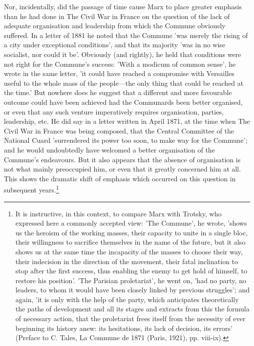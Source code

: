 Nor, incidentally, did the passage of time cause Marx to place greater emphasis than he had done in The Civil War in France on the question of the lack of adequate organisation and leadership from which the Commune obviously suffered. In a letter of 1881 he noted that the Commune 'was merely the rising of a city under exceptional conditions', and that its majority 'was in no wise socialist, nor could it be'. Obviously (and rightly), he held that conditions were not right for the Commune's success: 'With a modicum of common sense', he wrote in the same letter, 'it could have reached a compromise with Versailles useful to the whole mass of the people—the only thing that could be reached at the time.' But nowhere does he suggest that a different and more favourable outcome could have been achieved had the Communards been better organised, or even that any such venture imperatively requires organisation, parties, leadership, etc. He did say in a letter written in April 1871, at the time when The Civil War in France was being composed, that the Central Committee of the National Cuard 'surrendered its power too soon, to make way for the Commune'; and he would undoubtedly have welcomed a better organisation of the Commune's endeavours. But it also appears that the absence of organisation is not what mainly preoccupied him, or even that it greatly concerned him at all. This shows the dramatic shift of emphasis which occurred on this question in subsequent years.\footnote{It is instructive, in this context, to compare Marx with Trotsky, who expressed here a commonly accepted view: 'The Commune', he wrote, 'shows us the heroism of the working masses, their capacity to unite in a single bloc, their willingness to sacrifice themselves in the name of the future, but it also shows us at the same time the incapacity of the masses to choose their way, their indecision in the direction of the movement, their fatal inclination to stop after the first success, thus enabling the enemy to get hold of himself, to restore his position'. 'The Parisian proletariat', he went on, 'had no party, no leaders, to whom it would have been closely linked by previous struggles'; and again, 'it is only with the help of the party, which anticipates theoretically the paths of development and all its stages and extracts from this the formula of necessary action, that the proletariat frees itself from the necessity of ever beginning its history anew: its hesitations, its lack of decision, its errors' (Preface to C. Tales, La Commune de 1871 (Paris, 1921), pp. viii-ix).}

